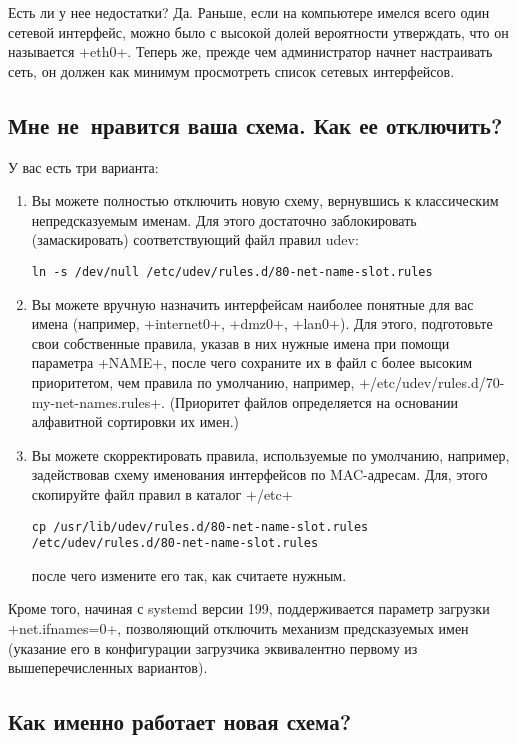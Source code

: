 \documentclass[10pt,oneside,a4paper]{article}
\begin{document}
Есть ли у нее недостатки? Да. Раньше, если на компьютере имелся всего один
сетевой интерфейс, можно было с высокой долей вероятности утверждать, что он
называется +eth0+. Теперь же, прежде чем администратор начнет настраивать сеть,
он должен как минимум просмотреть список сетевых интерфейсов.

\subsection{Мне не~нравится ваша схема. Как ее отключить?}

У вас есть три варианта:
\begin{enumerate}
	\item Вы можете полностью отключить новую схему, вернувшись к
		классическим непредсказуемым именам. Для этого достаточно
		заблокировать (замаскировать) соответствующий файл правил udev:
\begin{Verbatim}
ln -s /dev/null /etc/udev/rules.d/80-net-name-slot.rules
\end{Verbatim}
	\item Вы можете вручную назначить интерфейсам наиболее понятные для вас
		имена (например, +internet0+, +dmz0+, +lan0+). Для этого,
		подготовьте свои собственные правила, указав в них нужные имена
		при помощи параметра +NAME+, после чего сохраните их в файл с
		более высоким приоритетом, чем правила по умолчанию, например,
		+/etc/udev/rules.d/70-my-net-names.rules+. (Приоритет файлов
		определяется на основании алфавитной сортировки их имен.)
	\item Вы можете скорректировать правила, используемые по умолчанию,
		например, задействовав схему именования интерфейсов по
		MAC-адресам. Для, этого скопируйте файл правил в каталог +/etc+
\begin{Verbatim}
cp /usr/lib/udev/rules.d/80-net-name-slot.rules /etc/udev/rules.d/80-net-name-slot.rules
\end{Verbatim}
		после чего измените его так, как считаете нужным.
\end{enumerate}

Кроме того, начиная с systemd версии 199, поддерживается параметр загрузки
+net.ifnames=0+, позволяющий отключить механизм предсказуемых имен (указание его
в конфигурации загрузчика эквивалентно первому из вышеперечисленных вариантов).

\subsection{Как именно работает новая схема?}
\end{document}

